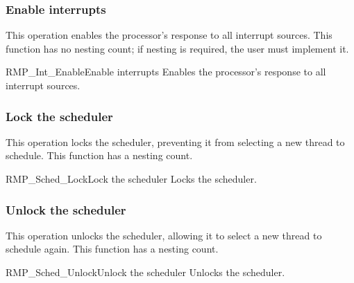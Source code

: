 \subsubsection{Enable interrupts}

This operation enables the processor's response to all interrupt sources.
This function has no nesting count; if nesting is required, the user must implement it.

\begin{apidesc}{RMP\_Int\_Enable}{Enable interrupts}\label{api:RMP_Int_Enable_Ch2}
    Enables the processor's response to all interrupt sources.
    \begin{apiparams}
    \end{apiparams}
    \begin{apiret}
    \end{apiret}
\end{apidesc}

\subsubsection{Lock the scheduler}

This operation locks the scheduler, preventing it from selecting a new thread to schedule.
This function has a nesting count.

\begin{apidesc}{RMP\_Sched\_Lock}{Lock the scheduler}\label{api:RMP_Sched_Lock}
    Locks the scheduler.
    \begin{apiparams}
    \end{apiparams}
    \begin{apiret}
    \end{apiret}
\end{apidesc}

\subsubsection{Unlock the scheduler}

This operation unlocks the scheduler, allowing it to select a new thread to schedule again.
This function has a nesting count.

\begin{apidesc}{RMP\_Sched\_Unlock}{Unlock the scheduler}\label{api:RMP_Sched_Unlock}
    Unlocks the scheduler.
    \begin{apiparams}
    \end{apiparams}
    \begin{apiret}
    \end{apiret}
\end{apidesc}

